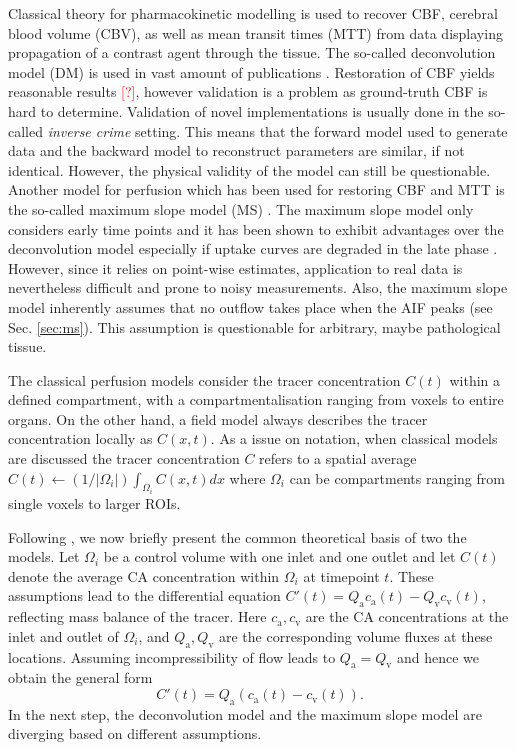 \documentclass[paper=a4, fontsize=11pt,parskip=half,headings=small]{scrartcl}
\newcommand{\ca}{c_\mathrm{a}}
\newcommand{\cout}{c_{\mathrm{v}}}
\newcommand{\Pa}{Q_{\mathrm{a}}}
\newcommand{\Pout}{Q_{\mathrm{v}}}
\newcommand{\missingsource}{\textcolor{red}{[?]}}
\begin{document}
	Classical theory for pharmacokinetic modelling is used to recover CBF, cerebral blood volume (CBV), as well as mean transit times (MTT) from data displaying propagation of a contrast agent through the tissue.
	The so-called deconvolution model (DM) is used in vast amount of publications \cite{ostergaard96,abels10,straka10,bivard13,sourbron13}.
	Restoration of CBF yields reasonable results \missingsource, however validation is a problem as ground-truth CBF is hard to determine.
	Validation of novel implementations is usually done in the so-called \emph{inverse crime} setting. 
	This means that the forward model used to generate data and the backward model to reconstruct parameters are similar, if not identical. However, the physical validity of the model can still be questionable.
	Another model for perfusion which has been used for restoring CBF and MTT is the so-called maximum slope model (MS) \cite{miles91,klotz99}.
	The maximum slope model only considers early time points and it has been shown to exhibit advantages over the deconvolution model especially if uptake curves are degraded in the late phase \cite{abels10}.
	However, since it relies on point-wise estimates, application to real data is nevertheless difficult and prone to noisy measurements.
	Also, the maximum slope model inherently assumes that no outflow takes place when the AIF peaks (see Sec. \ref{sec:ms}).
	This assumption is questionable for arbitrary, maybe pathological tissue.
	

	The classical perfusion models consider the tracer concentration $C(t)$ within a defined compartment, with a compartmentalisation ranging from voxels to entire organs. On the other hand, a field model always describes the tracer concentration locally as $C(x,t)$. As a issue on notation, when classical models are discussed the tracer concentration $C$ refers to a spatial average $C(t) \leftarrow (1/|\Omega_i|)\int_{\Omega_i}C(x,t)dx$ where $\Omega_i$ can be compartments ranging from single voxels to larger ROIs.
		
	Following \cite{sourbron13}, we now briefly present the common theoretical basis of two the models.
	Let $\Omega_i$ be a control volume with one inlet and one outlet and let $C(t)$ denote the average CA concentration within $\Omega_i$ at timepoint $t$.
	These assumptions lead to the differential equation $C'(t) = \Pa\ca(t) - \Pout\cout(t)$, reflecting mass balance of the tracer. 
	Here $\ca,\cout$ are the CA concentrations at the inlet and outlet of $\Omega_i$, and $\Pa,\Pout$ are the corresponding volume fluxes at these locations.
	Assuming incompressibility of flow leads to $\Pa = \Pout$ and hence we obtain the general form
	\begin{equation}
		C'(t) = \Pa\left(\ca(t) - \cout(t)\right).
		\label{eq:classicgeneral}
	\end{equation}
	In the next step, the deconvolution model and the maximum slope model are diverging based on different assumptions.
\end{document}
